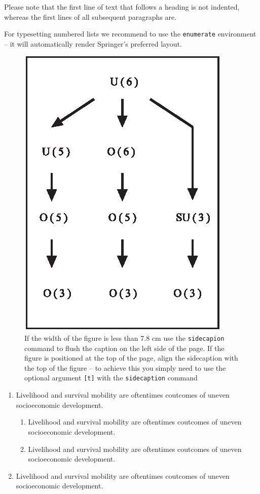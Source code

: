 Please note that the first line of text that follows a heading is not indented, whereas the first lines of all subsequent paragraphs are.

For typesetting numbered lists we recommend to use the \verb|enumerate| environment -- it will automatically render Springer's preferred layout.

\begin{figure}[b]
\sidecaption
\includegraphics[scale=.65]{figure}
%
%
\caption{If the width of the figure is less than 7.8 cm use the \texttt{sidecapion} command to flush the caption on the left side of the page. If the figure is positioned at the top of the page, align the sidecaption with the top of the figure -- to achieve this you simply need to use the optional argument \texttt{[t]} with the \texttt{sidecaption} command}
\label{fig:19}       %
\end{figure}

\begin{enumerate}
\item{Livelihood and survival mobility are oftentimes coutcomes of uneven socioeconomic development.}
\begin{enumerate}
\item{Livelihood and survival mobility are oftentimes coutcomes of uneven socioeconomic development.}
\item{Livelihood and survival mobility are oftentimes coutcomes of uneven socioeconomic development.}
\end{enumerate}
\item{Livelihood and survival mobility are oftentimes coutcomes of uneven socioeconomic development.}
\end{enumerate}


